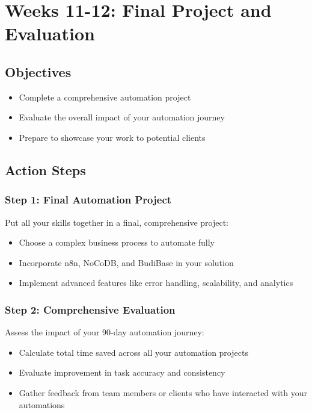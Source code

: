 

\section{Weeks 11-12: Final Project and Evaluation}

\subsection{Objectives}
\begin{itemize}
    \item Complete a comprehensive automation project
    \item Evaluate the overall impact of your automation journey
    \item Prepare to showcase your work to potential clients
\end{itemize}

\subsection{Action Steps}

\subsubsection{Step 1: Final Automation Project}
Put all your skills together in a final, comprehensive project:

\begin{itemize}
    \item Choose a complex business process to automate fully
    \item Incorporate n8n, NoCoDB, and BudiBase in your solution
    \item Implement advanced features like error handling, scalability, and analytics
\end{itemize}

\subsubsection{Step 2: Comprehensive Evaluation}
Assess the impact of your 90-day automation journey:

\begin{itemize}
    \item Calculate total time saved across all your automation projects
    \item Evaluate improvement in task accuracy and consistency
    \item Gather feedback from team members or clients who have interacted with your automations
\end{itemize}

